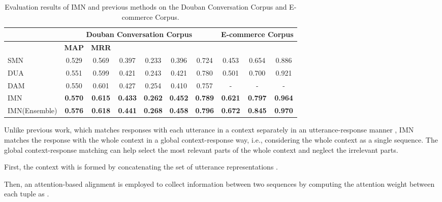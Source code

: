 \documentclass[sigconf]{acmart}
\begin{document}
    \begin{table*}[!hbt]
     \small
     \caption{Evaluation results of IMN and previous methods on the Douban Conversation Corpus and E-commerce Corpus.}
\centering
     \begin{tabular}{l|c|c|c|c|c|c|c|c|c}
      \toprule
                             & \multicolumn{6}{c|}{Douban Conversation Corpus} & \multicolumn{3}{c}{E-commerce Corpus} \\
      \hline
                             & \textbf{MAP} & \textbf{MRR} &  &  &  &  &  &  &  \\
      \hline
SMN \cite{DBLP:conf/acl/WuWXZL17}                  & 0.529 & 0.569 & 0.397 & 0.233 & 0.396 & 0.724 & 0.453 & 0.654 & 0.886  \\
       DUA \cite{DBLP:conf/coling/ZhangLZZL18}            & 0.551 & 0.599 & 0.421 & 0.243 & 0.421 & 0.780 & 0.501 & 0.700 & 0.921  \\
       DAM \cite{DBLP:conf/acl/WuLCZDYZL18}               & 0.550 & 0.601 & 0.427 & 0.254 & 0.410 & 0.757 & -     & -     & -      \\
      \hline
       IMN                  & \textbf{0.570} & \textbf{0.615} & \textbf{0.433} & \textbf{0.262} & \textbf{0.452} & \textbf{0.789} & \textbf{0.621} & \textbf{0.797} & \textbf{0.964}\\
       IMN(Ensemble)        & \textbf{0.576} & \textbf{0.618} & \textbf{0.441} & \textbf{0.268} & \textbf{0.458} & \textbf{0.796} & \textbf{0.672} & \textbf{0.845} & \textbf{0.970} \\
      \bottomrule
      \end{tabular}
      \label{tab3}
    \end{table*}

Unlike previous work, which matches responses with each utterance in a context separately in an utterance-response manner \cite{DBLP:conf/acl/WuWXZL17,DBLP:conf/acl/WuLCZDYZL18,DBLP:conf/coling/ZhangLZZL18}, IMN matches the response with the whole context in a global context-response way, i.e., considering the whole context as a single sequence.
The global context-response matching can help select the most relevant parts of the whole context and neglect the irrelevant parts.

    First, the context  with  is formed by concatenating the set of utterance representations .

    Then, an attention-based alignment is employed to collect information between two sequences by computing the attention weight between each tuple as .
\end{document}
